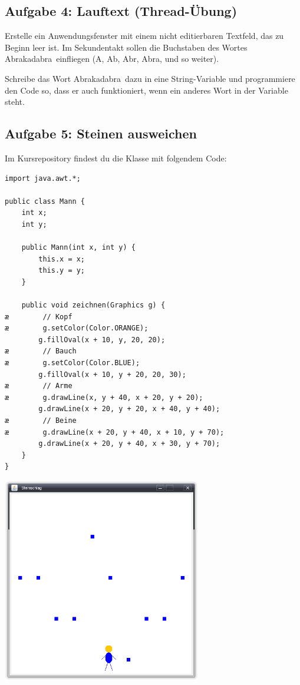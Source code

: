 \subsection{Aufgabe 4: Lauftext (Thread-Übung)}

Erstelle ein Anwendungsfenster mit einem nicht editierbaren Textfeld, das zu
Beginn leer ist. Im Sekundentakt sollen die Buchstaben des Wortes
\glqq Abrakadabra\grqq\ einfliegen (\glqq A\grqq , \glqq Ab\grqq , \glqq
Abr\grqq , \glqq Abra\grqq , und so weiter).

Schreibe das Wort \glqq Abrakadabra\grqq\ dazu in eine String-Variable und
programmiere den Code so, dass er auch funktioniert, wenn ein anderes Wort in
der Variable steht.


\subsection{Aufgabe 5: Steinen ausweichen}

Im Kursrepository findest du die Klasse  mit folgendem Code:

\begin{lstlisting}
import java.awt.*;

public class Mann {
    int x;
    int y;

    public Mann(int x, int y) {
        this.x = x;
        this.y = y;
    }

    public void zeichnen(Graphics g) {
æ        // Kopf
æ        g.setColor(Color.ORANGE);
        g.fillOval(x + 10, y, 20, 20);
æ        // Bauch
æ        g.setColor(Color.BLUE);
        g.fillOval(x + 10, y + 20, 20, 30);
æ        // Arme
æ        g.drawLine(x, y + 40, x + 20, y + 20);
        g.drawLine(x + 20, y + 20, x + 40, y + 40);
æ        // Beine
æ        g.drawLine(x + 20, y + 40, x + 10, y + 70);
        g.drawLine(x + 20, y + 40, x + 30, y + 70);
    }
}
\end{lstlisting}

\begin{center}
\includegraphics[width=0.65\textwidth]{./inf/SEKII/39_Java_UML_Wiederholung/FallendeSteine.png}
\end{center}

